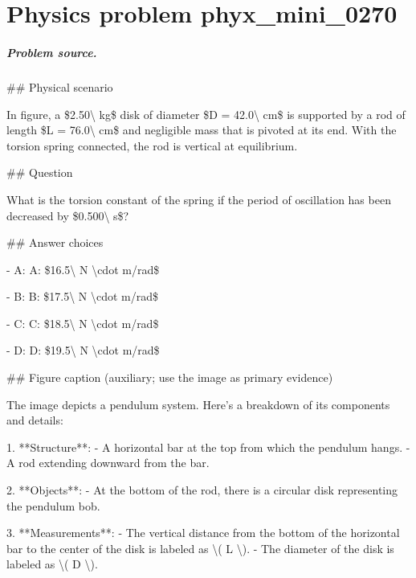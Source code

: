 
\chapter{Physics problem phyx\_mini\_0270}
\label{ch:PhyXMiniProblems_problem_phyx_mini_0270}

\paragraph{Problem source.}
\#\# Physical scenario

In figure, a \$2.50\textbackslash{} kg\$ disk of diameter \$D = 42.0\textbackslash{} cm\$ is supported by a rod of length \$L = 76.0\textbackslash{} cm\$ and negligible mass that is pivoted at its end. With the torsion spring connected, the rod is vertical at equilibrium.

\#\# Question

What is the torsion constant of the spring if the period of oscillation has been decreased by \$0.500\textbackslash{} s\$?

\#\# Answer choices

- A: A: \$16.5\textbackslash{} N \textbackslash{}cdot m/rad\$

- B: B: \$17.5\textbackslash{} N \textbackslash{}cdot m/rad\$

- C: C: \$18.5\textbackslash{} N \textbackslash{}cdot m/rad\$

- D: D: \$19.5\textbackslash{} N \textbackslash{}cdot m/rad\$

\#\# Figure caption (auxiliary; use the image as primary evidence)

The image depicts a pendulum system. Here's a breakdown of its components and details:

1. **Structure**: 
   - A horizontal bar at the top from which the pendulum hangs.
   - A rod extending downward from the bar.

2. **Objects**:
   - At the bottom of the rod, there is a circular disk representing the pendulum bob.

3. **Measurements**:
   - The vertical distance from the bottom of the horizontal bar to the center of the disk is labeled as \textbackslash{}( L \textbackslash{}).
   - The diameter of the disk is labeled as \textbackslash{}( D \textbackslash{}).

